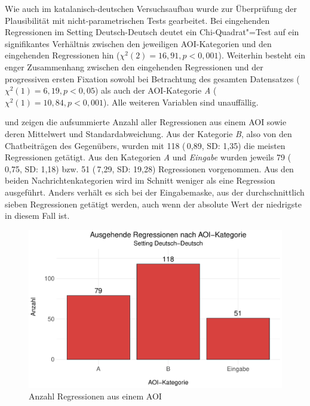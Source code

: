 

Wie auch im katalanisch-deutschen Versuchsaufbau wurde zur Überprüfung der Plausibilität mit nicht-parametrischen Tests gearbeitet. Bei eingehenden Regressionen im Setting Deutsch-Deutsch deutet ein Chi-Quadrat"=Test auf ein signifikantes Verhältnis zwischen den jeweiligen AOI-Kategorien und den eingehenden Regressionen hin ($\chi^2(2) = 16,91, p < 0,001$). Weiterhin besteht ein enger Zusammenhang zwischen den eingehenden Regressionen und der progressiven ersten Fixation sowohl bei Betrachtung des gesamten Datensatzes ($\chi^2(1) = 6,19, p < 0,05$) als auch der AOI-Kategorie \emph{A} ($\chi^2(1) = 10,84, p < 0,001$). Alle weiteren Variablen sind unauffällig.


\label{K6:para:regout:DD}


 und  zeigen die aufsummierte Anzahl aller Regressionen aus einem AOI sowie deren Mittelwert und Standardabweichung. Aus der Kategorie \emph{B}, also von den Chatbeiträgen des Gegenübers, wurden mit 118 (\diameter\,0,89, SD: 1,35) die meisten Regressionen getätigt. Aus den Kategorien \emph{A} und \emph{Eingabe} wurden jeweils 79 (\diameter\,0,75, SD: 1,18) bzw. 51 (\diameter\,7,29, SD: 19,28) Regressionen vorgenommen. Aus den beiden Nachrichtenkategorien wird im Schnitt weniger als eine Regression ausgeführt. Anders verhält es sich bei der Eingabemaske, aus der durchschnittlich sieben Regressionen getätigt werden, auch wenn der absolute Wert der niedrigste in diesem Fall ist.

\begin{figure}
    \includegraphics[width=.85\textwidth]{Figures/EyeTracking/DD/ggplot_regression_DD_OUT_AOI_de}
	\caption{Anzahl Regressionen aus einem AOI\label{K6:fig:DeDe:RegOut-AOI-Count}}
\end{figure}

